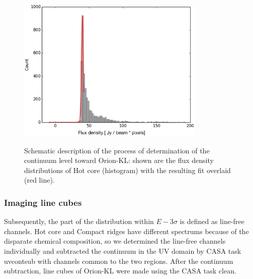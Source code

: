 \begin{figure}[htbp] 
\begin{center}
\includegraphics[width=0.8\textwidth]{OrionKL/ex_histogram_fit.eps}
\label{fig:histo}
\caption{Schematic description of the process of determination of the continuum level toward Orion-KL: 
shown are the flux density distributions of Hot core (histogram) with the resulting fit overlaid (red line).}
\end{center}
\end{figure}

\newpage

\subsubsection*{Imaging line cubes}
Subsequently, the part of the distribution within $E - 3\sigma$ is defined as line-free channels.
Hot core and Compact ridges have different spectrums because of the disparate chemical composition, 
so we determined the line-free channels individually and subtracted the continuum
in the UV domain by CASA task {\sc uvcontsub} with channels common to the two regions.
After the continuum subtraction, line cubes of Orion-KL were made using the CASA task {\sc clean}.

